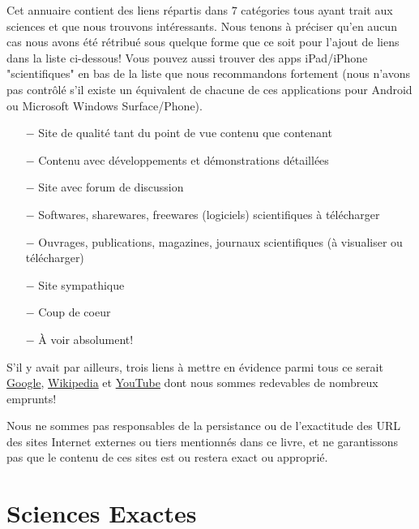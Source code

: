 	Cet annuaire contient des liens répartis dans $7$ catégories tous ayant trait aux sciences et que nous trouvons intéressants. Nous tenons à préciser qu'en aucun cas nous avons été rétribué sous quelque forme que ce soit pour l'ajout de liens dans la liste ci-dessous! Vous pouvez aussi trouver des apps iPad/iPhone "scientifiques" en bas de la liste que nous recommandons fortement (nous n'avons pas contrôlé s'il existe un équivalent de chacune de ces applications pour Android ou Microsoft Windows Surface/Phone).
	
	\begin{itemize}	 
		\item[$-$] {\Large {}} Site de qualité tant du point de vue contenu que contenant
		\item[$-$] {\Large {}} Contenu avec développements et démonstrations détaillées
		\item[$-$] {\Large {}} Site avec forum de discussion
		\item[$-$] {\Large {}} Softwares, sharewares, freewares (logiciels) scientifiques à télécharger
		\item[$-$] {\Large {}} Ouvrages, publications, magazines, journaux scientifiques (à visualiser ou télécharger)
		\item[$-$] {\Large {}} Site sympathique
		\item[$-$] {\Large {}} Coup de coeur
		\item[$-$] {\Large {}} À voir absolument!
	\end{itemize}	
	S'il y avait par ailleurs, trois liens à mettre en évidence parmi tous ce serait \href{http://www.google.com}{\color{blue} Google}, \href{http://www.wikipedia.com}{\color{blue} Wikipedia} et \href{http://www.youtube.com}{\color{blue} YouTube} dont nous sommes redevables de nombreux emprunts!
		
	\begin{tcolorbox}[title=Remark,colframe=black,arc=10pt]
	Nous ne sommes pas responsables de la persistance ou de l'exactitude des URL des sites Internet externes ou tiers mentionnés dans ce livre, et ne garantissons pas que le contenu de ces sites est ou restera exact ou approprié.
	\end{tcolorbox}
	
	\pagebreak

	\section{Sciences Exactes}

